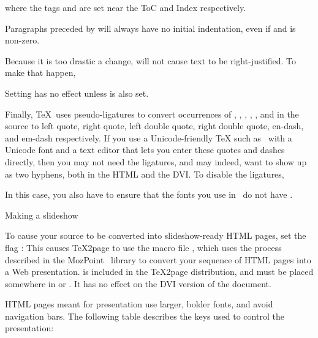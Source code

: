 %

\n where the tags  and  are set near
the ToC and Index respectively.

%
Paragraphs preceded by \p{\noindent} will always have no initial
indentation, even if  and \p{\parskip} is
non-zero.

Because it is too drastic a change,  will not cause
text to be right-justified.  To make that happen,


\n Setting \p{\TZPraggedright} has no effect unless \p{\TZPtexlayout} is
also set.

Finally, \TeX\ uses pseudo-ligatures to convert occurrences of , , , , \p{--}, and \p{---}
in the source to left quote, right quote, left double quote, right double quote, en-dash, and em-dash respectively.
If you use a Unicode-friendly TeX such as \XeTeX\ with a Unicode font and a text editor that lets you enter these quotes and dashes directly, then you may
not need the ligatures, and may indeed, want \p{--} to show up as two hyphens, both in the HTML and the DVI.  To disable the ligatures,


\n In this case, you also have to ensure that the fonts you use in \XeTeX\ do not have .


\beginsection Making a slideshow

%
To cause your source to be converted into slideshow-ready HTML pages,
set the flag \p{\TZPslides}:
This causes \TeX2page to use the macro file
, which uses the process described in
the MozPoint~\cite{mozpoint} library
to convert your sequence of HTML
pages into a Web presentation.   is included in the
\TeX2page distribution, and must be placed
somewhere in  or .  It has no
effect on the DVI version of the document.

HTML pages meant for presentation use larger, bolder fonts, and
avoid navigation bars.  The following table describes the keys used to
control the presentation:

